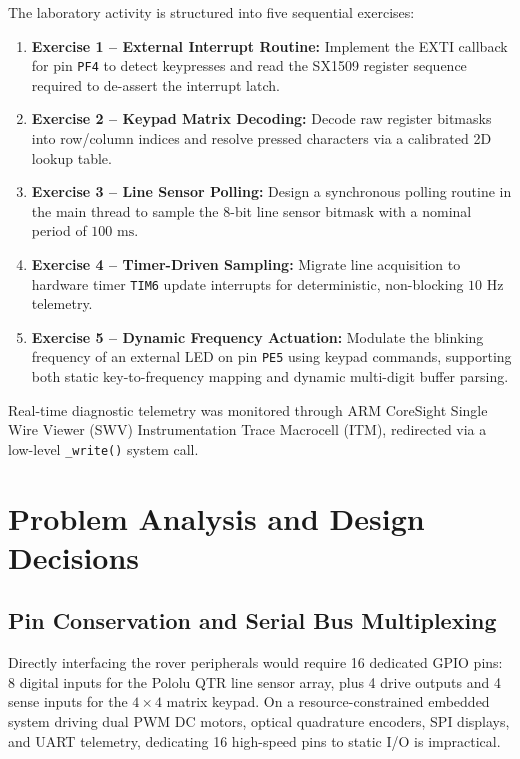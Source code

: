 The laboratory activity is structured into five sequential exercises:
\begin{enumerate}[noitemsep,topsep=2pt]
    \item \textbf{Exercise 1 -- External Interrupt Routine:} Implement the EXTI callback for pin \texttt{PF4} to detect keypresses and read the SX1509 register sequence required to de-assert the interrupt latch.
    \item \textbf{Exercise 2 -- Keypad Matrix Decoding:} Decode raw register bitmasks into row/column indices and resolve pressed characters via a calibrated 2D lookup table.
    \item \textbf{Exercise 3 -- Line Sensor Polling:} Design a synchronous polling routine in the main thread to sample the 8-bit line sensor bitmask with a nominal period of $100\text{ ms}$.
    \item \textbf{Exercise 4 -- Timer-Driven Sampling:} Migrate line acquisition to hardware timer \texttt{TIM6} update interrupts for deterministic, non-blocking $10\text{ Hz}$ telemetry.
    \item \textbf{Exercise 5 -- Dynamic Frequency Actuation:} Modulate the blinking frequency of an external LED on pin \texttt{PE5} using keypad commands, supporting both static key-to-frequency mapping and dynamic multi-digit buffer parsing.
\end{enumerate}

Real-time diagnostic telemetry was monitored through ARM CoreSight Single Wire Viewer (SWV) Instrumentation Trace Macrocell (ITM), redirected via a low-level \texttt{\_write()} system call.

\section{Problem Analysis and Design Decisions}

\subsection{Pin Conservation and Serial Bus Multiplexing}
Directly interfacing the rover peripherals would require 16 dedicated GPIO pins: 8 digital inputs for the Pololu QTR line sensor array, plus 4 drive outputs and 4 sense inputs for the $4 \times 4$ matrix keypad. On a resource-constrained embedded system driving dual PWM DC motors, optical quadrature encoders, SPI displays, and UART telemetry, dedicating 16 high-speed pins to static I/O is impractical.

